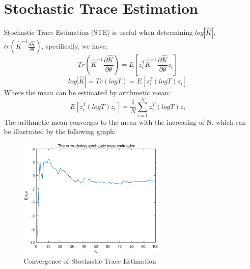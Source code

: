 \documentclass{article} %
\begin{document}
\section{Stochastic Trace Estimation}
Stochastic Trace Estimation (STE) \cite{2} is useful when determining $log|\hat{K}|$, $tr(\hat{K}^{-1}\frac{\partial \hat{K}}{\partial \theta})$, specifically, we have:
\begin{equation}
Tr(\hat{K}^{-1}\frac{\partial \hat{K}}{\partial \theta})=E[z_i^T\hat{K}^{-1}\frac{\partial \hat{K}}{\partial \theta}z_i]
\end{equation}
\begin{equation}
log|\hat{K}|=Tr(logT)=E[z_i^T(logT)z_i]
\end{equation}
Where the mean can be estimated by arithmetic mean:
\begin{equation}
E[z_i^T(logT)z_i]=\frac{1}{N}\sum_{i=1}^{N}z_i^T(logT)z_i
\end{equation}
The arithmetic mean converges to the mean with the increasing of N, which can be illustrated by the following graph:
 \begin{figure}[H]
	\begin{center}
		\includegraphics[width=0.65\textwidth]{error}
	\end{center}
	\caption{Convergence of Stochastic Trace Estimation}
	\label{fig5}
\end{figure}
 
\end{document}
